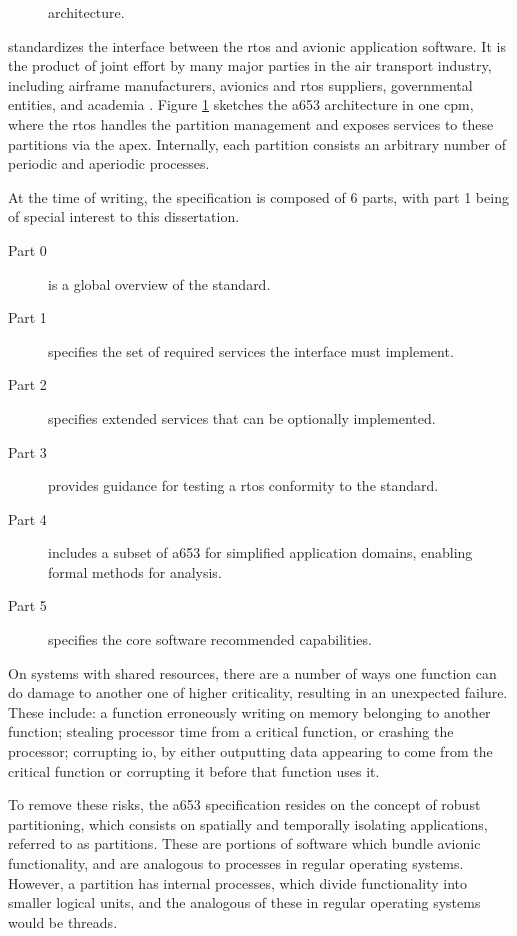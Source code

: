 \documentclass[main.tex]{subfiles}
\begin{document}
\begin{figure}[htbp]
	\centering
	\resizebox{0.95\linewidth}{!}{}
	\caption{ architecture.}
	\label{fig:arinc-scheme}
\end{figure}

 \cite{arinc653} standardizes the interface between the \gls{rtos} and avionic application software.
It is the product of joint effort by many major parties in the air transport industry, including airframe manufacturers, avionics and \gls{rtos} suppliers, governmental entities, and academia \cite{prisaznuk2008arinc}.
Figure \ref{fig:arinc-scheme} sketches the \gls{a653} architecture in one \gls{cpm}, where the \gls{rtos} handles the partition management and exposes services to these partitions via the \gls{apex}.
Internally, each partition consists an arbitrary number of periodic and aperiodic processes.

At the time of writing, the specification is composed of 6 parts, with part 1 being of special interest to this dissertation. 
\begin{description}
	\item[Part 0] is a global overview of the standard.
	\item[Part 1] specifies the set of required services the interface must implement.
	\item[Part 2] specifies extended services that can be optionally implemented.
	\item[Part 3] provides guidance for testing a \gls{rtos} conformity to the standard.
	\item[Part 4] includes a subset of \gls{a653} for simplified application domains, enabling formal methods for analysis.
	\item[Part 5] specifies the core software recommended capabilities.
\end{description}

On systems with shared resources, there are a number of ways one function can do damage to another one of higher criticality, resulting in an unexpected failure.
These include: a function erroneously writing on memory belonging to another function; stealing processor time from a critical function, or crashing the processor; corrupting \gls{io}, by either outputting data appearing to come from the critical function or corrupting it before that function uses it.

To remove these risks, the \gls{a653} specification resides on the concept of robust partitioning, which consists on spatially and temporally isolating applications, referred to as partitions.
These are portions of software which bundle avionic functionality, and are analogous to processes in regular operating systems.
However, a partition has internal processes, which divide functionality into smaller logical units, and the analogous of these in regular operating systems would be threads.
\end{document}
